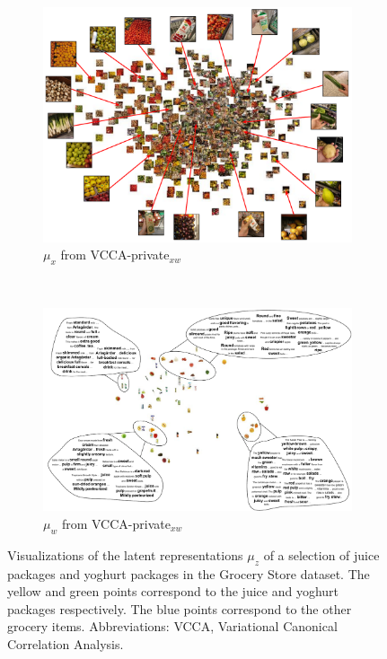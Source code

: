 \begin{figure}[!tp]
\begin{subfigure}[b]{0.49\textwidth}
         \label{fig:pca_vcca_private_xw_z}
     \end{subfigure} \\
     \begin{subfigure}[b]{0.6\textwidth}
         \centering
         \includegraphics[width=\textwidth]{figures_and_tables/private_latent_space_visualizations/vcca_private_ux_space.pdf}
         \caption{$\mu_{x}$ from VCCA-private$_{x w}$}
         \label{fig:pca_vcca_private_xw_ux}
     \end{subfigure} \\
     \begin{subfigure}[b]{0.7\textwidth}
         \centering
         \includegraphics[width=\textwidth]{figures_and_tables/private_latent_space_visualizations/vcca_private_uw_space.pdf}
         \caption{$\mu_{w}$ from VCCA-private$_{x w}$}
         \label{fig:pca_vcca_private_xw_uw}
     \end{subfigure} 
    \caption{Visualizations of the latent representations $\mu_{z}$ of a selection of juice packages and yoghurt packages in the Grocery Store dataset. The yellow and green points correspond to the juice and yoghurt packages respectively. The blue points correspond to the other grocery items. Abbreviations: VCCA, Variational Canonical Correlation Analysis.}
    \label{fig:2d_visualizations_pca_vcca_private_xw}
\end{figure}